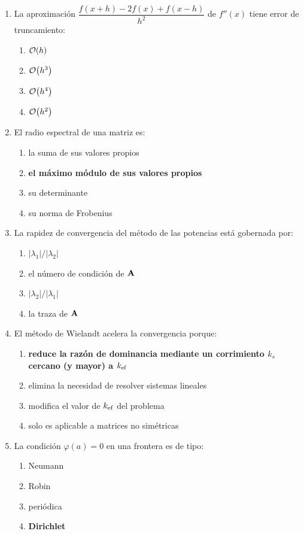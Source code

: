 \begin{enumerate}[label=\textbf{\arabic*.},leftmargin=*,itemsep=8pt]
	\item La aproximación $\dfrac{f(x+h) - 2f(x) + f(x-h)}{h^2}$ de $f''(x)$ tiene error de truncamiento:
	\begin{enumerate}[label=\alph*)]
		\item $\mathcal{O}\!\left(h\right)$ \item $\mathcal{O}\!\left(h^3\right)$ \item $\mathcal{O}\!\left(h^4\right)$ \item {\bfseries\boldmath\color{red} $\mathcal{O}\!\left(h^2\right)$}
	\end{enumerate}
	
	\item El radio espectral de una matriz es:
	\begin{enumerate}[label=\alph*)]
		\item la suma de sus valores propios 
		\item {\bfseries\boldmath\color{red} el máximo módulo de sus valores propios}
		\item su determinante 
		\item su norma de Frobenius
	\end{enumerate}
	
	\item La rapidez de convergencia del método de las potencias está gobernada por:
	\begin{enumerate}[label=\alph*)]
		\item $|\lambda_1|/|\lambda_2|$ 
		\item el número de condición de $\mathbf{A}$
		\item {\bfseries\boldmath\color{red} $|\lambda_2|/|\lambda_1|$} 
		\item la traza de $\mathbf{A}$
	\end{enumerate}
	
	\item El método de Wielandt acelera la convergencia porque:
	\begin{enumerate}[label=\alph*)]
		\item {\bfseries\boldmath\color{red} reduce la razón de dominancia mediante un corrimiento $k_s$ cercano (y mayor) a $k_{\mathrm{ef}}$}
		\item elimina la necesidad de resolver sistemas lineales
		\item modifica el valor de $k_{\mathrm{ef}}$ del problema
		\item solo es aplicable a matrices no simétricas
	\end{enumerate}
	
	\item La condición $\varphi(a) = 0$ en una frontera es de tipo:
	\begin{enumerate}[label=\alph*)]
		\item Neumann 
		\item Robin 
		\item periódica 
		\item {\bfseries\boldmath\color{red} Dirichlet}
	\end{enumerate}
	

\end{enumerate}
